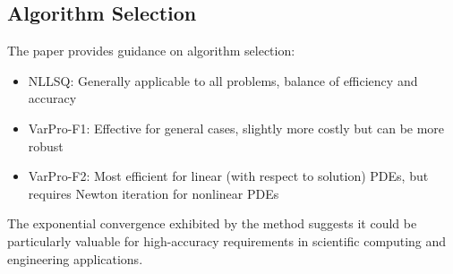 \documentclass[11pt,a4paper]{article}
\begin{document}
\subsection{Algorithm Selection}

The paper provides guidance on algorithm selection:
\begin{itemize}
    \item NLLSQ: Generally applicable to all problems, balance of efficiency and accuracy
    \item VarPro-F1: Effective for general cases, slightly more costly but can be more robust
    \item VarPro-F2: Most efficient for linear (with respect to solution) PDEs, but requires Newton iteration for nonlinear PDEs
\end{itemize}

The exponential convergence exhibited by the method suggests it could be particularly valuable for high-accuracy requirements in scientific computing and engineering applications.
\end{document}
